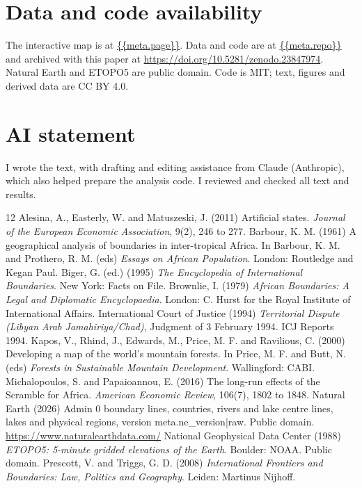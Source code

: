 \documentclass[11pt,a4paper]{article}
\begin{document}
\section*{Data and code availability}
The interactive map is at \url{{{meta.page}}}. Data and code are at \url{{{meta.repo}}} and archived with this paper at \url{https://doi.org/10.5281/zenodo.23847974}. Natural Earth and ETOPO5 are public domain. Code is MIT; text, figures and derived data are CC BY 4.0.

\section*{AI statement}
I wrote the text, with drafting and editing assistance from Claude (Anthropic), which also helped prepare the analysis code. I reviewed and checked all text and results.

\begin{thebibliography}{12}
 Alesina, A., Easterly, W. and Matuszeski, J. (2011) Artificial states. \emph{Journal of the European Economic Association}, 9(2), 246 to 277.
 Barbour, K. M. (1961) A geographical analysis of boundaries in inter-tropical Africa. In Barbour, K. M. and Prothero, R. M. (eds) \emph{Essays on African Population}. London: Routledge and Kegan Paul.
 Biger, G. (ed.) (1995) \emph{The Encyclopedia of International Boundaries}. New York: Facts on File.
 Brownlie, I. (1979) \emph{African Boundaries: A Legal and Diplomatic Encyclopaedia}. London: C. Hurst for the Royal Institute of International Affairs.
 International Court of Justice (1994) \emph{Territorial Dispute (Libyan Arab Jamahiriya/Chad)}, Judgment of 3 February 1994. ICJ Reports 1994.
 Kapos, V., Rhind, J., Edwards, M., Price, M. F. and Ravilious, C. (2000) Developing a map of the world's mountain forests. In Price, M. F. and Butt, N. (eds) \emph{Forests in Sustainable Mountain Development}. Wallingford: CABI.
 Michalopoulos, S. and Papaioannou, E. (2016) The long-run effects of the Scramble for Africa. \emph{American Economic Review}, 106(7), 1802 to 1848.
 Natural Earth (2026) Admin 0 boundary lines, countries, rivers and lake centre lines, lakes and physical regions, version {{meta.ne_version|raw}}. Public domain. \url{https://www.naturalearthdata.com/}
 National Geophysical Data Center (1988) \emph{ETOPO5: 5-minute gridded elevations of the Earth}. Boulder: NOAA. Public domain.
 Prescott, V. and Triggs, G. D. (2008) \emph{International Frontiers and Boundaries: Law, Politics and Geography}. Leiden: Martinus Nijhoff.
\end{thebibliography}
\end{document}
